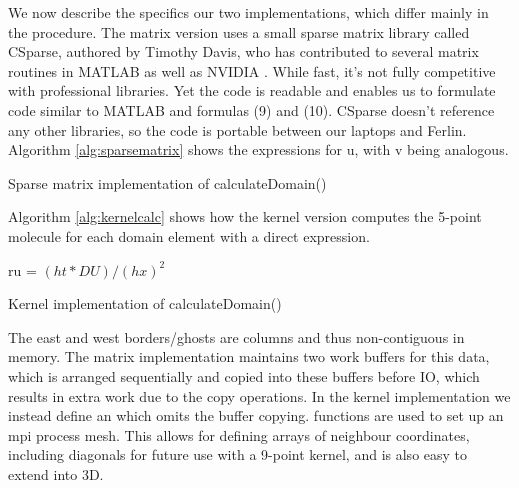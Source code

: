 \documentclass[a4paper,11pt]{article}
\begin{document}
We now describe the specifics our two implementations, which differ mainly in the  procedure. The matrix version uses a small sparse matrix library called CSparse, authored by Timothy Davis, who has contributed to several matrix routines in MATLAB as well as NVIDIA \cite{Davis}.  While fast, it's not fully competitive with professional libraries. Yet the code is readable and enables us to formulate code similar to MATLAB and formulas (9) and (10). CSparse doesn't reference any other libraries, so the code is portable between our laptops and Ferlin. Algorithm \ref{alg:sparsematrix} shows the expressions for u, with v being analogous. 

\vspace{0.7 cm}
\begin{algorithm}[H]
\label{alg:sparsematrix}
  \SetAlgoLined
  \caption{Sparse matrix implementation of calculateDomain()}
\end{algorithm}
\vspace{0.7 cm}



Algorithm \ref{alg:kernelcalc} shows how the kernel version computes the 5-point molecule for each domain element with a direct expression.

\vspace{0.7 cm}
\begin{algorithm}[H]
\label{alg:kernelcalc}
  \SetAlgoLined
  ru = $(ht * DU) / (hx)^2$\;

  \caption{Kernel implementation of calculateDomain()}
\end{algorithm}
\vspace{0.7 cm}


The east and west borders/ghosts are columns and thus non-contiguous in memory. The matrix implementation maintains two work buffers for this data, which is arranged sequentially and copied into these buffers before IO, which results in extra work due to the copy operations. In the kernel implementation we instead define an  which omits the buffer copying.  functions are used to set up an mpi process mesh. This allows for defining arrays of neighbour coordinates, including diagonals for future use with a 9-point kernel, and is also easy to extend into 3D. 
\end{document}
